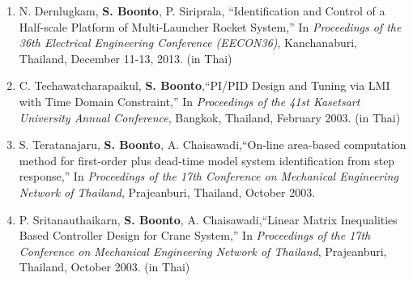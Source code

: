 \documentclass[10pt]{article}
\renewcommand{\section}[2]%
        {\pagebreak[2]\vspace{1.3\baselineskip}%
         \phantomsection\addcontentsline{toc}{section}{#1}%
         \hspace{0in}%
         \marginpar{
         \raggedright \scshape #1}#2}
\newenvironment{outerlist}[1][\enskip\textbullet]%
        {\begin{enumerate}[#1]}{\end{enumerate}%
         \vspace{-.6\baselineskip}}
\newenvironment{innerlist}[1][\enskip\textbullet]%
        {\begin{compactenum}[#1]}{\end{compactenum}}
\begin{document}
\begin{enumerate}
    \item N. Dernlugkam, \textbf{S. Boonto}, P. Siriprala, ``Identification and Control of a Half-scale Platform of Multi-Launcher Rocket System,'' In \emph{Proceedings of the 36th Electrical Engineering Conference (EECON36)}, Kanchanaburi, Thailand, December 11-13, 2013. (in Thai)
	\item C. Techawatcharapaikul, \textbf{S. Boonto},``PI/PID Design and Tuning
        via LMI with Time Domain Constraint,'' In \emph{Proceedings of the 41st
        Kasetsart University Annual Conference}, Bangkok, Thailand,
        February 2003. (in Thai)
    \item S. Teratanajaru, \textbf{S. Boonto}, A. Chaisawadi,``On-line
        area-based computation method for first-order plus dead-time model
        system identification from step response,'' In \emph{Proceedings of the
        17th Conference on Mechanical Engineering Network of Thailand},
        Prajeanburi, Thailand, October 2003.
    \item P. Sritanauthaikarn,\textbf{ S. Boonto}, A. Chaisawadi,``Linear
        Matrix Inequalities Based Controller Design for Crane System,''
        In \emph{Proceedings of the 17th Conference on Mechanical Engineering
        Network of Thailand}, Prajeanburi, Thailand, October 2003.
        (in Thai)
\end{enumerate}
\end{document}
